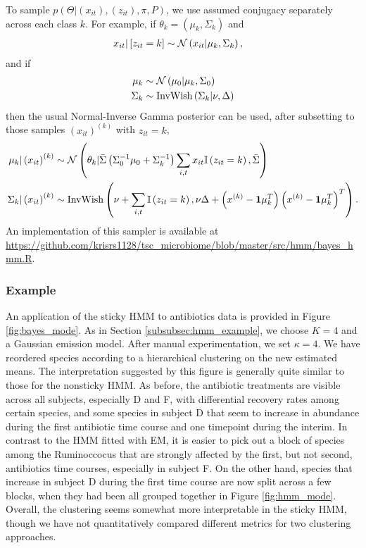 \documentclass[14pt]{extarticle}
\begin{document}
To sample $p\left(\Theta \vert \left(x_{it}\right), \left(z_{it}\right), \pi,
P\right)$, we use assumed conjugacy separately across each class $k$. For
example, if $\theta_{k} = \left(\mu_{k}, \Sigma_{k}\right)$ and
\begin{align*}
  x_{it} \vert \left[z_{it} = k\right] &\sim \mathcal{N}\left(x_{it} \vert \mu_{k}, \Sigma_{k}\right),
\end{align*}
and if
\begin{align*}
  \mu_{k} &\sim \mathcal{N}\left(\mu_{0} \vert \mu_{k}, \Sigma_{0}\right) \\
  \Sigma_{k} &\sim \text{InvWish}\left(\Sigma_{k} \vert \nu, \Delta\right)
\end{align*}
then the usual Normal-Inverse Gamma posterior can be used, after subsetting to
those samples $\left(x_{it}\right)^{(k)}$ with $z_{it} = k$,
\begin{align*}
  \mu_{k} \vert \left(x_{it}\right)^{(k)} &\sim \mathcal{N}\left(\theta_{k} \vert \bar{\Sigma}\left(\Sigma_0^{-1}\mu_{0} + \Sigma_{k}^{-1}\right) \sum_{i, t} x_{it}\mathbb{I}\left({z_{it} = k}\right), \bar{\Sigma}\right) \\
  \Sigma_{k} \vert \left(x_{it} \right)^{(k)} &\sim  \text{InvWish}\left(\nu + \sum_{i, t} \mathbb{I}\left({z_{it} = k}\right), \nu \Delta + \left(x^{(k)} - \mathbf{1} \mu_{k}^{T}\right)\left(x^{(k)} - \mathbf{1} \mu_{k}^{T}\right)^{T}\right).
\end{align*}
An implementation of this sampler is available at
\url{https://github.com/krisrs1128/tsc\_microbiome/blob/master/src/hmm/bayes\_hmm.R}.

\subsubsection{Example}
\label{subsubsec:sticky_hmm_example}

An application of the sticky HMM to antibiotics data is provided in Figure
\ref{fig:bayes_mode}. As in Section \ref{subsubsec:hmm_example}, we choose $K =
4$ and a Gaussian emission model. After manual experimentation, we set $\kappa =
4$. We have reordered species according to a hierarchical clustering on the new
estimated means. The interpretation suggested by this figure is generally quite
similar to those for the nonsticky HMM. As before, the antibiotic treatments are
visible across all subjects, especially D and F, with differential recovery
rates among certain species, and some species in subject D that seem to increase
in abundance during the first antibiotic time course and one timepoint during
the interim. In contrast to the HMM fitted with EM, it is easier to pick out a
block of species among the Ruminoccocus that are strongly affected by the first,
but not second, antibiotics time courses, especially in subject F. On the other
hand, species that increase in subject D during the first time course are now
split across a few blocks, when they had been all grouped together in Figure
\ref{fig:hmm_mode}. Overall, the clustering seems somewhat more interpretable in
the sticky HMM, though we have not quantitatively compared different metrics for
two clustering approaches.
\end{document}
